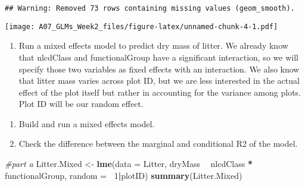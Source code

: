 \documentclass[]{article}
\newenvironment{Shaded}{\begin{snugshade}}{\end{snugshade}}
\newcommand{\CommentTok}[1]{\textcolor[rgb]{0.56,0.35,0.01}{\textit{#1}}}
\newcommand{\DataTypeTok}[1]{\textcolor[rgb]{0.13,0.29,0.53}{#1}}
\newcommand{\DecValTok}[1]{\textcolor[rgb]{0.00,0.00,0.81}{#1}}
\newcommand{\KeywordTok}[1]{\textcolor[rgb]{0.13,0.29,0.53}{\textbf{#1}}}
\newcommand{\NormalTok}[1]{#1}
\newcommand{\OperatorTok}[1]{\textcolor[rgb]{0.81,0.36,0.00}{\textbf{#1}}}
\newcommand{\StringTok}[1]{\textcolor[rgb]{0.31,0.60,0.02}{#1}}
\providecommand{\tightlist}{%
  \setlength{\itemsep}{0pt}\setlength{\parskip}{0pt}}
\begin{document}
\begin{verbatim}
## Warning: Removed 73 rows containing missing values (geom_smooth).
\end{verbatim}

\texttt{[image: A07\_GLMs\_Week2\_files/figure-latex/unnamed-chunk-4-1.pdf]}

\begin{enumerate}
\def\labelenumi{\arabic{enumi}.}
\setcounter{enumi}{8}
\tightlist
\item
  Run a mixed effects model to predict dry mass of litter. We already
  know that nlcdClass and functionalGroup have a significant
  interaction, so we will specify those two variables as fixed effects
  with an interaction. We also know that litter mass varies across plot
  ID, but we are less interested in the actual effect of the plot itself
  but rather in accounting for the variance among plots. Plot ID will be
  our random effect.
\end{enumerate}

\begin{enumerate}
\def\labelenumi{\alph{enumi}.}
\tightlist
\item
  Build and run a mixed effects model.
\item
  Check the difference between the marginal and conditional R2 of the
  model.
\end{enumerate}

\begin{Shaded}
\begin{Highlighting}[]
\CommentTok{#part a}
\NormalTok{Litter.Mixed <-}\StringTok{ }\KeywordTok{lme}\NormalTok{(}\DataTypeTok{data =}\NormalTok{ Litter, }
\NormalTok{                    dryMass }\OperatorTok{~}\StringTok{ }\NormalTok{nlcdClass }\OperatorTok{*}\StringTok{ }\NormalTok{functionalGroup,}
                    \DataTypeTok{random =} \OperatorTok{~}\DecValTok{1}\OperatorTok{|}\NormalTok{plotID)}
\KeywordTok{summary}\NormalTok{(Litter.Mixed)}
\end{Highlighting}
\end{Shaded}
\end{document}
